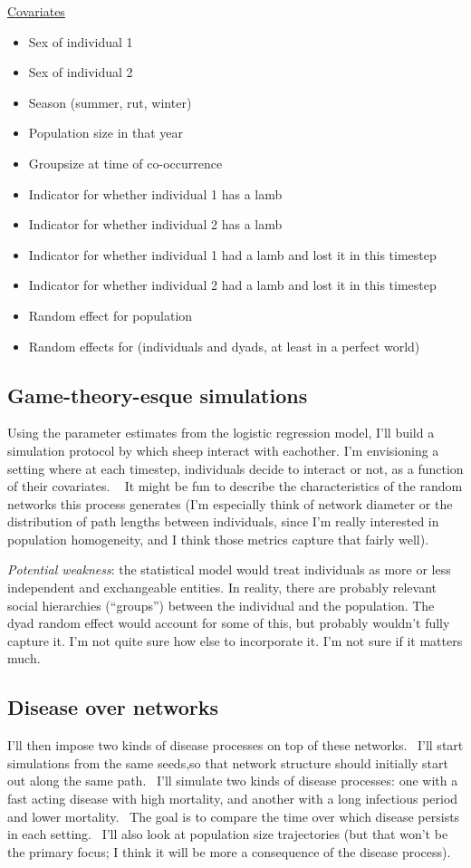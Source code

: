 \documentclass{article}\usepackage{graphicx, color}
\begin{document}
\underline{Covariates}
\begin{itemize}
\item Sex of individual 1
\item Sex of individual 2
\item Season (summer, rut, winter)
\item Population size in that year
\item Groupsize at time of co-occurrence
\item Indicator for whether individual 1 has a lamb
\item Indicator for whether individual 2 has a lamb
\item Indicator for whether individual 1 had a lamb and lost it in this timestep
\item Indicator for whether individual 2 had a lamb and lost it in this timestep
\item Random effect for population
\item Random effects for (individuals and dyads, at least in a perfect world)
\end{itemize}

\subsection*{Game-theory-esque simulations}
Using the parameter estimates from the logistic regression model, I'll build a simulation protocol by which  sheep interact with eachother.  I'm envisioning a setting where at each timestep, individuals decide to interact or not, as a function of their covariates.   It might be fun to describe the characteristics of the random networks this process generates (I'm especially think of network diameter or the distribution of path lengths between individuals, since I'm really interested in population homogeneity, and I think those metrics capture that fairly well).  

\vspace{.1in}

\textit{Potential weakness}:  the statistical model would treat individuals as more or less independent and exchangeable entities.  In reality, there are probably relevant social hierarchies (“groups”) between the individual and the population.  The dyad random effect would account for some of this, but probably wouldn't fully capture it.  I'm not quite sure how else to incorporate it. I'm not sure if it matters much. 

\subsection*{Disease over networks}
I'll then impose two kinds of disease processes on top of these networks.  I'll start simulations from the same seeds,so that network structure should initially start out along the same path.  I'll simulate two kinds of disease processes: one with a fast acting disease with high mortality, and another with a long infectious period and lower mortality.  The goal is to compare the time over which disease persists in each setting.  I'll also look at population size trajectories (but that won't be the primary focus; I think it will be more a consequence of the disease process).
\end{document}
